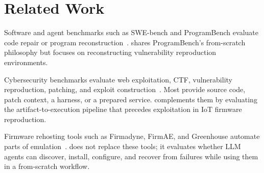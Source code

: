 \section{Related Work}
Software and agent benchmarks such as SWE-bench and ProgramBench evaluate code repair or program reconstruction~\cite{swebench,programbench}. \sys{} shares ProgramBench's from-scratch philosophy but focuses on reconstructing vulnerability reproduction environments.

Cybersecurity benchmarks evaluate web exploitation, CTF, vulnerability reproduction, patching, and exploit construction~\cite{cybergym,cvebench,secbench,bountybench,exploitgym,exploitbench,krepro}. Most provide source code, patch context, a harness, or a prepared service. \sys{} complements them by evaluating the artifact-to-execution pipeline that precedes exploitation in IoT firmware reproduction.

Firmware rehosting tools such as Firmadyne, FirmAE, and Greenhouse automate parts of emulation~\cite{firmadyne,firmae,greenhouse}. \sys{} does not replace these tools; it evaluates whether LLM agents can discover, install, configure, and recover from failures while using them in a from-scratch workflow.
